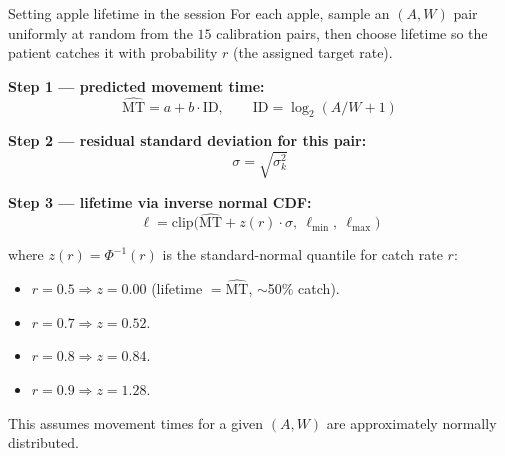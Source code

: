 \documentclass[10pt,aspectratio=169]{beamer}
\begin{document}
\begin{frame}{Setting apple lifetime in the session}
For each apple, sample an $(A, W)$ pair uniformly at random from the $15$ calibration pairs, then choose lifetime so the patient catches it with probability $r$ (the assigned target rate).

\textbf{Step 1 --- predicted movement time:}
\[
\widehat{\text{MT}} = a + b \cdot \text{ID}, \qquad \text{ID} = \log_2(A/W + 1)
\]

\textbf{Step 2 --- residual standard deviation for this pair:}
\[
\sigma = \sqrt{\sigma_k^2}
\]

\textbf{Step 3 --- lifetime via inverse normal CDF:}
\[
\boxed{\ell = \mathrm{clip}\bigl(\widehat{\text{MT}} + z(r) \cdot \sigma,\ \ell_{\min},\ \ell_{\max}\bigr)}
\]

where $z(r) = \Phi^{-1}(r)$ is the standard-normal quantile for catch rate $r$:
\begin{itemize}
    \item $r = 0.5 \Rightarrow z = 0.00$ (lifetime $= \widehat{\text{MT}}$, $\sim$50\% catch).
    \item $r = 0.7 \Rightarrow z = 0.52$.
    \item $r = 0.8 \Rightarrow z = 0.84$.
    \item $r = 0.9 \Rightarrow z = 1.28$.
\end{itemize}

This assumes movement times for a given $(A, W)$ are approximately normally distributed.
\end{frame}
\end{document}
